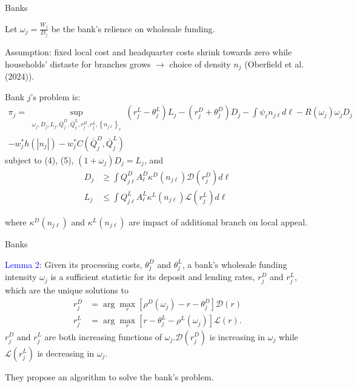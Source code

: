 \documentclass[notes,10pt, aspectratio=169]{beamer}
\newenvironment{wideitemize}{\itemize\addtolength{\itemsep}{10pt}}{\enditemize}
\begin{document}
\begin{frame}{Banks}


    \begin{wideitemize}
        \item Let $\omega_j = \frac{W_j}{D_j}$ be the bank's relience on wholesale funding.
        \item Assumption: fixed local cost and headquarter costs shrink towards zero  while households' distaste for branches grows $\rightarrow$ choice of density $n_j$ (Oberfield et al. (2024)).
        \item Bank $j$'s problem is:
        $$
    \begin{aligned}
\pi_j=\sup _{\substack{\omega_j, D_j, L_j, \bar{Q}_j^D, \bar{Q}_j^L, r_j^D, r_j^L,\left\{n_{j \ell}\right\}_{\ell}}}\left(r_j^L-\theta_j^L\right) L_j- \left(r_j^D+\theta_j^D\right) D_j-\int \psi_{\ell} n_{j \ell} d \ell   -R\left(\omega_j\right) \omega_j D_j   \\ -w_j^* h\left(\left|n_j\right|\right)-w_j^* C\left(\bar{Q}_j^D, \bar{Q}_j^L\right)
\end{aligned}
$$
subject to (4), (5), $\left(1+\omega_j\right) D_j=L_j$, and 
$$
\begin{aligned}
D_j & \geq \int Q_{j \ell}^D A_{\ell}^D \kappa^D\left(n_{j \ell}\right) \mathcal{D}\left(r_j^D\right) d \ell \\
L_j & \leq \int Q_{j \ell}^L A_{\ell}^L \kappa^L\left(n_{j \ell}\right) \mathcal{L}\left(r_j^L\right) d \ell
\end{aligned}
$$

where $\kappa^D\left(n_{j \ell}\right)$ and $\kappa^L\left(n_{j \ell}\right)$  are impact of additional branch on local appeal. 


    \end{wideitemize}


\end{frame}


\begin{frame}{Banks}

\begin{wideitemize}
    \item \textcolor{blue}{Lemma 2}:  Given its processing costs, $\theta_j^D$ and $\theta_j^L$, a bank's wholesale funding intensity $\omega_j$ is a sufficient statistic for its deposit and lending rates, $r_j^D$ and $r_j^L$, which are the unique solutions to
$$
\begin{aligned}
r_j^D & =\arg \max _r\left[\rho^D\left(\omega_j\right)-r-\theta_j^D\right] \mathcal{D}(r) \\
r_j^L & =\arg \max _r\left[r-\theta_j^L-\rho^L\left(\omega_j\right)\right] \mathcal{L}(r) .
\end{aligned}
$$
$r_j^D$ and $r_j^L$ are both increasing functions of $\omega_j . \mathcal{D}\left(r_j^D\right)$ is increasing in $\omega_j$ while $\mathcal{L}\left(r_j^L\right)$ is decreasing in $\omega_j$.

\item They propose an algorithm to solve the bank's problem.

\end{wideitemize}
\end{frame}
\end{document}
